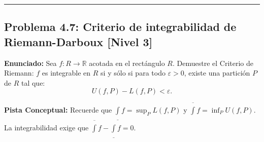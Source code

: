 \documentclass[11pt,a4paper]{article}
\begin{document}
\vspace{0.5cm}
\hrule
\vspace{0.5cm}

\subsection*{Problema 4.7: Criterio de integrabilidad de Riemann-Darboux \hfill \color{primaryblue}\small[Nivel 3]}

\begin{tcolorbox}[colback=white,colframe=gray!40,arc=1mm,boxrule=0.5pt,left=3mm,right=3mm,top=2mm,bottom=2mm]
\textbf{Enunciado:} Sea $f: R \to \mathbb{R}$ acotada en el rectángulo $R$. Demuestre el Criterio de Riemann:
$f$ es integrable en $R$ si y sólo si para todo $\varepsilon > 0$, existe una partición $P$ de $R$ tal que:
\begin{equation*}
U(f, P) - L(f, P) < \varepsilon.
\end{equation*}
\end{tcolorbox}

\begin{tcolorbox}[colback=yellow!4,colframe=accentamber!70,arc=1mm,boxrule=0.5pt,left=3mm,right=3mm,top=1.5mm,bottom=1.5mm]
\textbf{Pista Conceptual:} Recuerde que $\underline{\int} f = \sup_P L(f,P)$ y $\overline{\int} f = \inf_P U(f,P)$. La integrabilidad exige que $\overline{\int} f - \underline{\int} f = 0$.
\end{tcolorbox}
\end{document}
